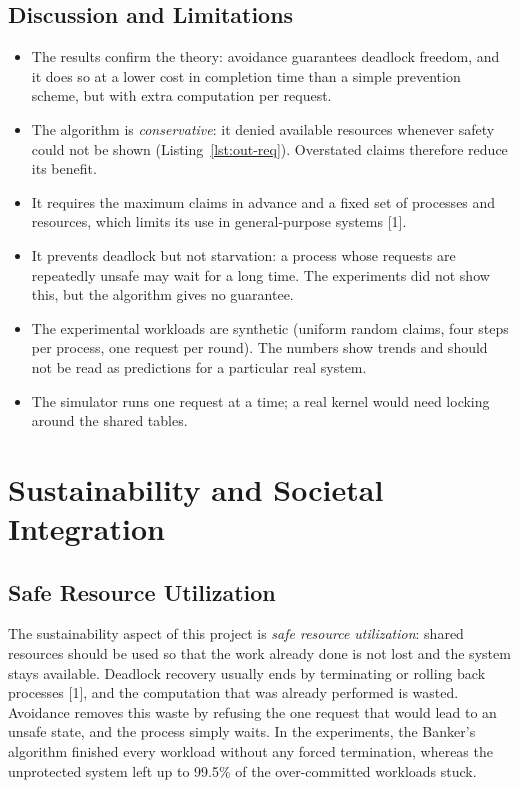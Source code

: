 \documentclass[11pt,a4paper]{report}
\begin{document}
\subsection{Discussion and Limitations}
\begin{itemize}
    \item The results confirm the theory: avoidance guarantees deadlock freedom, and it does so at a lower cost in completion time than a simple prevention scheme, but with extra computation per request.
    \item The algorithm is \emph{conservative}: it denied available resources whenever safety could not be shown (Listing~\ref{lst:out-req}). Overstated claims therefore reduce its benefit.
    \item It requires the maximum claims in advance and a fixed set of processes and resources, which limits its use in general-purpose systems [1].
    \item It prevents deadlock but not starvation: a process whose requests are repeatedly unsafe may wait for a long time. The experiments did not show this, but the algorithm gives no guarantee.
    \item The experimental workloads are synthetic (uniform random claims, four steps per process, one request per round). The numbers show trends and should not be read as predictions for a particular real system.
    \item The simulator runs one request at a time; a real kernel would need locking around the shared tables.
\end{itemize}

\section{Sustainability and Societal Integration}
\subsection{Safe Resource Utilization}
The sustainability aspect of this project is \emph{safe resource utilization}: shared resources should be used so that the work already done is not lost and the system stays available. Deadlock recovery usually ends by terminating or rolling back processes [1], and the computation that was already performed is wasted. Avoidance removes this waste by refusing the one request that would lead to an unsafe state, and the process simply waits. In the experiments, the Banker's algorithm finished every workload without any forced termination, whereas the unprotected system left up to 99.5\% of the over-committed workloads stuck.
\end{document}
